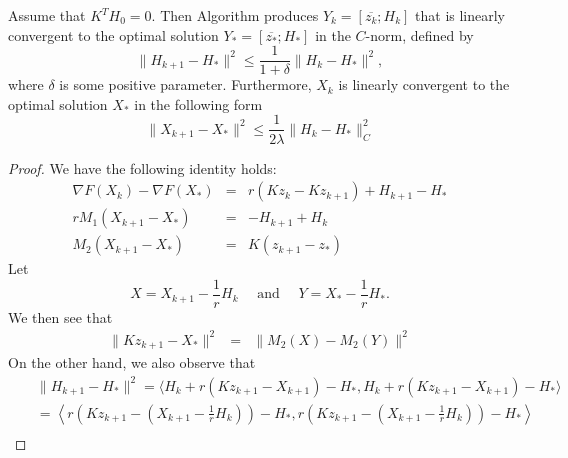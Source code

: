\begin{itemize}
\begin{theorem}
Assume that $K^TH_0 = 0$. Then Algorithm produces 
$Y_k = [\overline{z_k}; H_k]$ that is linearly convergent to the optimal solution  $Y_* = [\overline{z_*}; H_*]$ in the $C$-norm, defined by 
\begin{equation}
\|H_{k+1} - H_* \|^2 \leq \frac{1}{1+\delta} \| H_{k} - H_*\|^2,
\end{equation}
where $\delta$ is some positive parameter. Furthermore, $X_k$ is linearly convergent to the optimal solution $X_*$ in the following form
\begin{equation}
\|X_{k+1} - X_* \|^2 \leq \frac{1}{2 \lambda} \|H_{k} - H_* \|^2_C
\end{equation}
\end{theorem}

\begin{proof}
We have the following identity holds: 
\begin{eqnarray*}
\nabla F(X_{k}) - \nabla F(X_*) &=& r( K z_{k} - K {z_{k+1}}) + H_{k+1} - H_* \\
r M_1 (X_{k+1} - X_*) &=& - H_{k+1} + H_k \\
M_2 (X_{k+1} - X_*) &=& K(z_{k+1} - z_*)
\end{eqnarray*}
Let 
\begin{equation}
X = X_{k+1} - \frac{1}{r}H_k \quad \mbox{ and } \quad Y = X_* - \frac{1}{r}H_*. 
\end{equation}
We then see that 
\begin{eqnarray*}
\|Kz_{k+1} - X_* \|^2 &=& \|M_2(X) - M_2(Y)\|^2%
\end{eqnarray*}
On the other hand, we also observe that
\begin{eqnarray*}
&& \|H_{k+1} - H_* \|^2 = \langle H_{k} + r (Kz_{k+1} - X_{k+1}) - H_*, H_{k} + r (Kz_{k+1} - X_{k+1}) - H_* \rangle \\ 
&& = \left \langle r \left( Kz_{k+1} - \left ( X_{k+1} - \frac{1}{r} H_k \right ) \right ) - H_*, r \left( Kz_{k+1} - \left ( X_{k+1} - \frac{1}{r} H_k \right ) \right ) - H_* \right \rangle \\

\end{eqnarray*}
\end{proof}
\end{itemize}
